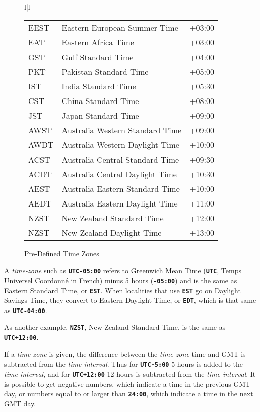 \documentclass[12pt]{article}
\newcommand{\TT}[1]{{\tt \bfseries #1}}
\newlength{\figurewidth}
\newenvironment{boxedfigure}[1][!btp]%
	{\begin{figure*}[#1]
	 \begin{lrbox}{\figurebox}
	 \begin{minipage}{\figurewidth}

	 \vspace*{1ex}}%
	{
	 \vspace*{1ex}

	 \end{minipage}
	 \end{lrbox}
	 \begin{center}
	 \fbox{\hspace*{0.1in}\usebox{\figurebox}\hspace*{0.1in}}
	 \end{center}
	 \end{figure*}}
\begin{document}
\begin{boxedfigure}[t]
\begin{center}
\begin{tabular}{l|l}
\begin{tabular}{@{}lll@{}}
EEST  & Eastern European Summer Time  & +03:00 \\
EAT   & Eastern Africa Time           & +03:00 \\
GST   & Gulf Standard Time            & +04:00 \\
PKT   & Pakistan Standard Time        & +05:00 \\
IST   & India Standard Time           & +05:30 \\
CST   & China Standard Time           & +08:00 \\
JST   & Japan Standard Time           & +09:00 \\
AWST  & Australia Western Standard Time        & +09:00 \\
AWDT  & Australia Western Daylight Time        & +10:00 \\
ACST  & Australia Central Standard Time        & +09:30 \\
ACDT  & Australia Central Daylight Time        & +10:30 \\
AEST  & Australia Eastern Standard Time        & +10:00 \\
AEDT  & Australia Eastern Daylight Time        & +11:00 \\
NZST  & New Zealand Standard Time     & +12:00 \\
NZST  & New Zealand Daylight Time     & +13:00 \\
\end{tabular}
\end{tabular}
\end{center}
\vspace*{-3ex}
\caption{Pre-Defined Time Zones}
\label{PRE-DEFINED-TIME-ZONES}
\end{boxedfigure}

A {\em time-zone} such as \TT{UTC-05:00} refers to Greenwich Mean Time
(\TT{UTC}, Temps Universel Coordonn\'e in French)
minus 5 hours (\TT{-05:00}) and is the same as
Eastern Standard Time, or \TT{EST}.   When localities that use \TT{EST}
go on Daylight Savings Time, they convert to Eastern Daylight Time, or
\TT{EDT}, which is that same as \TT{UTC-04:00}.

As another example, \TT{NZST}, New Zealand Standard Time, is the same
as \TT{UTC+12:00}.

If a {\em time-zone} is given, the difference between the {\em time-zone}
time and GMT is subtracted from the {\em time-interval}.
Thus for \TT{UTC-5:00} 5 hours is added to the {\em time-interval},
and for \TT{UTC+12:00} 12 hours is subtracted from the {\em time-interval}.
It is possible to get negative numbers, which indicate a time in the previous
GMT day, or numbers equal to or larger than \TT{24:00}, which indicate
a time in the next GMT day.
\end{document}

